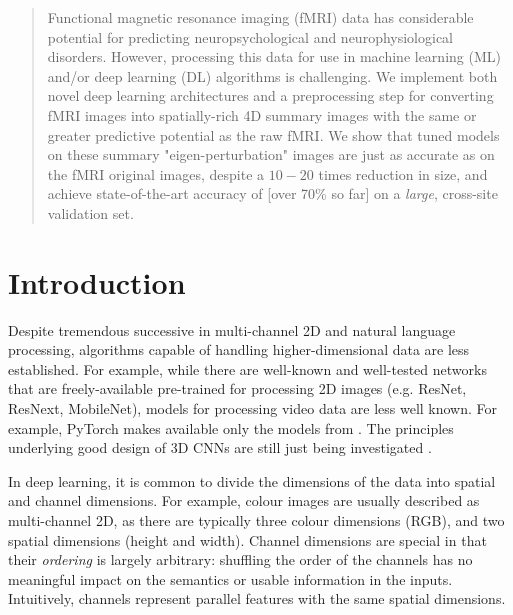 \documentclass[10pt]{article}
\begin{document}
\maketitle

\begin{abstract}
  Functional magnetic resonance imaging (fMRI) data has considerable potential for predicting
  neuropsychological and neurophysiological disorders. However, processing this data for use in
  machine learning (ML) and/or deep learning (DL) algorithms is challenging. We implement both novel
  deep learning architectures and a preprocessing step for converting fMRI images into
  spatially-rich 4D summary images with the same or greater predictive potential as the raw fMRI. We
  show that tuned models on these summary "eigen-perturbation" images are just as accurate as on the
  fMRI original images, despite a \(10-20\) times reduction in size, and achieve state-of-the-art
  accuracy of [over 70\% so far] on a \emph{large}, cross-site validation set.
\end{abstract}

\section{Introduction}

Despite tremendous successive in multi-channel 2D and natural language processing, algorithms
capable of handling higher-dimensional data are less established. For example, while there are
well-known and well-tested networks that are freely-available pre-trained for processing 2D images
(e.g. ResNet, ResNext, MobileNet), models for processing video data are less well known. For
example, PyTorch makes available only the models from \citet{tranCloserLookSpatiotemporal2018}. The
principles underlying good design of 3D CNNs are still just being investigated
\citep{xieRethinkingSpatiotemporalFeature2018}.

In deep learning, it is common to divide the dimensions of the data into spatial and channel
dimensions. For example, colour images are usually described as multi-channel 2D, as there are
typically three colour dimensions (RGB), and two spatial dimensions (height and width). Channel
dimensions are special in that their \emph{ordering} is largely arbitrary: shuffling the order of
the channels has no meaningful impact on the semantics or usable information in the inputs.
Intuitively, channels represent parallel features with the same spatial dimensions.
\end{document}
